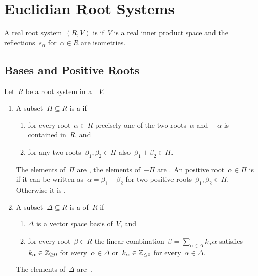 \section{Euclidian Root Systems}


\begin{definition}
  A real root system~$(R, V)$ is  if~$V$ is a real inner product space and the reflections~$s_\alpha$ for~$\alpha \in R$ are isometries.
\end{definition}






\subsection{Bases and Positive Roots}


\begin{definition}
  Let~$R$ be a root system in a~{\vectorspace{$\kf$}}~$V$.
  \begin{enumerate}
    \item
      A subset~$\Pi \subseteq R$ is a  if
      \begin{enumerate}
        \item
          for every root~$\alpha \in R$ precisely one of the two roots~$\alpha$ and~$-\alpha$ is contained in~$R$, and
        \item
          for any two roots~$\beta_1, \beta_2 \in \Pi$ also~$\beta_1 + \beta_2 \in \Pi$.
      \end{enumerate}
      The elements of~$\Pi$ are , the elements of~$-\Pi$ are .
      An positive root~$\alpha \in \Pi$ is  if it can be written as~$\alpha = \beta_1 + \beta_2$ for two positive roots~$\beta_1, \beta_2 \in \Pi$.
      Otherwise it is .
    \item
      A subset~$\Delta \subseteq R$ is a  of~$R$ if 
      \begin{enumerate}
        \item
          $\Delta$ is a vector space basis of~$V$, and
        \item
          for every root~$\beta \in R$ the linear combination~$\beta = \sum_{\alpha \in \Delta} k_\alpha \alpha$ satisfies~$k_\alpha \in \mathbb{Z}_{\geq 0}$ for every~$\alpha \in \Delta$ or~$k_\alpha \in \mathbb{Z}_{\leq 0}$ for every~$\alpha \in \Delta$.
      \end{enumerate}
      The elements of~$\Delta$ are~.
  \end{enumerate}
\end{definition}


